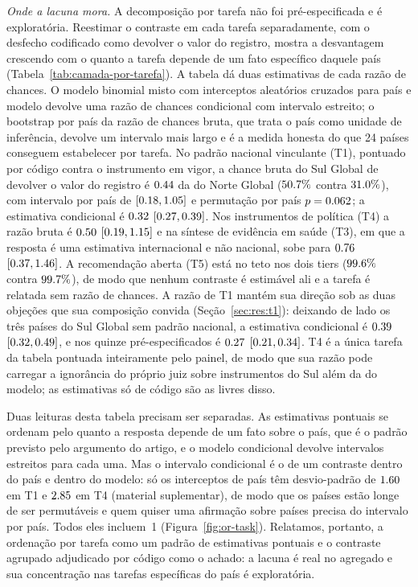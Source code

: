 \emph{Onde a lacuna mora.} A decomposição por tarefa não foi pré-especificada
e é exploratória. Reestimar o contraste em cada tarefa separadamente, com o
desfecho codificado como devolver o valor do registro, mostra a desvantagem
crescendo com o quanto a tarefa depende de um fato específico daquele país
(Tabela~\ref{tab:camada-por-tarefa}). A tabela dá duas estimativas de cada
razão de chances. O modelo binomial misto com interceptos aleatórios cruzados
para país e modelo devolve uma razão de chances condicional com intervalo
estreito; o bootstrap por país da razão de chances bruta, que trata o país
como unidade de inferência, devolve um intervalo mais largo e é a medida
honesta do que 24 países conseguem estabelecer por tarefa. No padrão nacional
vinculante (T1), pontuado por código contra o instrumento em vigor, a chance
bruta do Sul Global de devolver o valor do registro é $0.44$ da do Norte
Global ($50.7\%$ contra $31.0\%$), com intervalo por país de
$[0.18,1.05]$ e permutação por país $p=0.062$; a estimativa condicional
é $0.32$ $[0.27,0.39]$. Nos instrumentos de política (T4) a razão bruta é
$0.50$ $[0.19,1.15]$ e na síntese de evidência em saúde (T3), em que a
resposta é uma estimativa internacional e não nacional, sobe para
$0.76$ $[0.37,1.46]$. A recomendação aberta (T5) está no teto nos
dois tiers ($99.6\%$ contra $99.7\%$), de modo que nenhum
contraste é estimável ali e a tarefa é relatada sem razão de chances. A razão de
T1 mantém sua direção sob as duas objeções que sua composição convida
(Seção~\ref{sec:res:t1}): deixando de lado os três países do Sul Global sem
padrão nacional, a estimativa condicional é $0.39$ $[0.32,0.49]$, e nos
quinze pré-especificados é $0.27$ $[0.21,0.34]$. T4 é a única tarefa da
tabela pontuada inteiramente pelo painel, de modo que sua razão pode carregar a
ignorância do próprio juiz sobre instrumentos do Sul além da do modelo; as
estimativas só de código são as livres disso.

Duas leituras desta tabela precisam ser separadas. As estimativas pontuais se
ordenam pelo quanto a resposta depende de um fato sobre o país, que é o padrão
previsto pelo argumento do artigo, e o modelo condicional devolve intervalos
estreitos para cada uma. Mas o intervalo condicional é o de um contraste dentro
do país e dentro do modelo: só os interceptos de país têm desvio-padrão de
$1.60$ em T1 e $2.85$ em T4 (material suplementar), de modo que
os países estão longe de ser permutáveis e quem quiser uma afirmação sobre
países precisa do intervalo por país. Todos eles incluem~1
(Figura~\ref{fig:or-task}). Relatamos, portanto, a ordenação por tarefa como um
padrão de estimativas pontuais e o contraste agrupado adjudicado por código como
o achado: a lacuna é real no agregado e sua concentração nas tarefas
específicas do país é exploratória.

